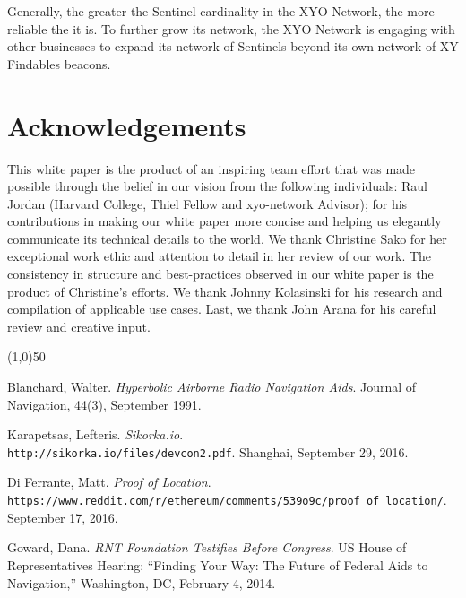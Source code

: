 \documentclass{article}
\begin{document}
Generally, the greater the Sentinel cardinality in the XYO Network, the more reliable the it is. To further grow its network, the XYO Network is engaging with other businesses to expand its network of Sentinels beyond its own network of XY Findables beacons.

\section {Acknowledgements}
This white paper is the product of an inspiring team effort that was made possible through the belief in our vision from the following individuals: Raul Jordan (Harvard College, Thiel Fellow and \Gls{xyo-network} Advisor); for his contributions in making our white paper more concise and helping us elegantly communicate its technical details to the world. We thank Christine Sako for her exceptional work ethic and attention to detail in her review of our work. The consistency in structure and best-practices observed in our white paper is the product of Christine's efforts. We thank Johnny Kolasinski for his research and compilation of applicable use cases. Last, we thank John Arana for his careful review and creative input.

\begin{center}
\line(1,0){50}
\end{center}



\begin{thebibliography}{9}

Blanchard, Walter.
\textit{Hyperbolic Airborne Radio Navigation Aids}.
Journal of Navigation, 44(3), September 1991.

Karapetsas, Lefteris.
\textit{Sikorka.io}.
\\\texttt{http://sikorka.io/files/devcon2.pdf}.
Shanghai, September 29, 2016.

Di Ferrante, Matt.
\textit{Proof of Location}.
\\\texttt{https://www.reddit.com/r/ethereum/comments/539o9c/proof\_of\_location/}.
September 17, 2016.

Goward, Dana.
\textit{RNT Foundation Testifies Before Congress}.
US House of Representatives Hearing: ``Finding Your Way: The Future of Federal Aids to Navigation,'' Washington, DC, February 4, 2014.

\end{thebibliography}

\clearpage

\printglossaries

\end{document}
